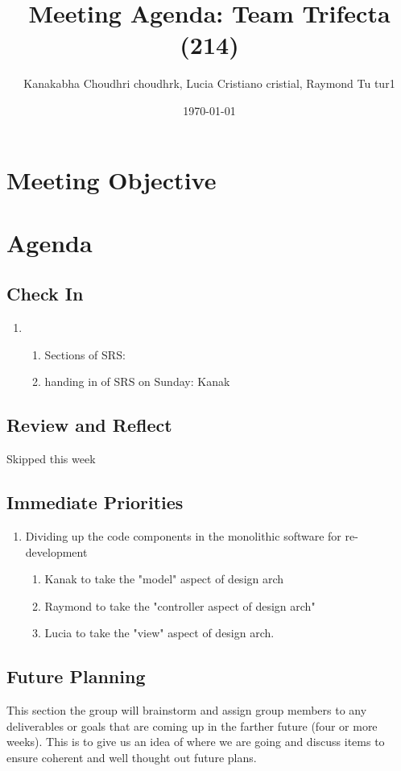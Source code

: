 \documentclass{article}
\title{Meeting Agenda: Team Trifecta (214)}
\author{Kanakabha Choudhri choudhrk, Lucia Cristiano cristial, Raymond Tu tur1}
\date{\today}
\begin{document}
\maketitle

\section*{Meeting Objective}

\section*{Agenda}
\subsection*{Check In}
\begin{enumerate}
    \item
    \begin{enumerate}
        \item Sections of SRS: 
        \item handing in of SRS on Sunday: Kanak
    \end{enumerate}
\end{enumerate}
   

\subsection*{Review and Reflect}
Skipped this week


\subsection*{Immediate Priorities}

\begin{enumerate}
    \item Dividing up the code components in the monolithic software for re-development
    \begin{enumerate}
        \item Kanak to take the "model" aspect of design arch
        \item Raymond to take the "controller aspect of design arch"
        \item Lucia to take the "view" aspect of design arch.
    \end{enumerate}
\end{enumerate}

\subsection*{Future Planning}
This section the group will brainstorm and assign group members to any deliverables or goals that are coming up in the farther future (four or more weeks). This is to give us an idea of where we are going and discuss items to ensure coherent and well thought out future plans.
\end{document}
